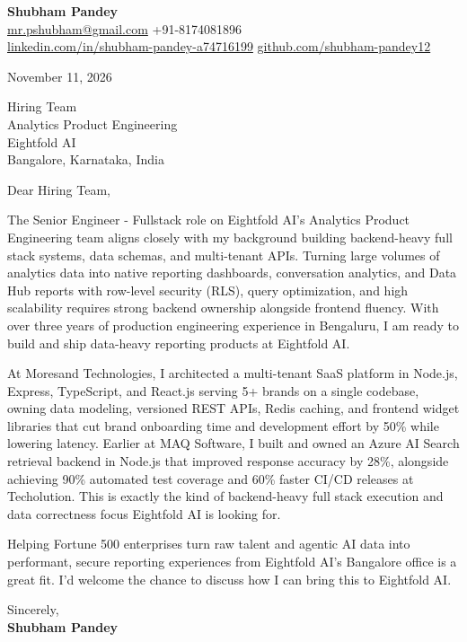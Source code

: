 \documentclass[a4paper,11pt]{article}
\begin{document}
\textbf{\Large Shubham Pandey}\\
\href{mailto:mr.pshubham@gmail.com}{mr.pshubham@gmail.com} \quad +91-8174081896\\
\href{https://www.linkedin.com/in/shubham-pandey-a74716199/}{linkedin.com/in/shubham-pandey-a74716199} \quad
\href{https://github.com/shubham-pandey12}{github.com/shubham-pandey12}

\vspace{1em}
November 11, 2026

\vspace{1em}
Hiring Team\\
Analytics Product Engineering\\
Eightfold AI\\
Bangalore, Karnataka, India

\vspace{1em}
Dear Hiring Team,

The Senior Engineer - Fullstack role on Eightfold AI's Analytics Product Engineering team aligns closely with my background building backend-heavy full stack systems, data schemas, and multi-tenant APIs. Turning large volumes of analytics data into native reporting dashboards, conversation analytics, and Data Hub reports with row-level security (RLS), query optimization, and high scalability requires strong backend ownership alongside frontend fluency. With over three years of production engineering experience in Bengaluru, I am ready to build and ship data-heavy reporting products at Eightfold AI.

At Moresand Technologies, I architected a multi-tenant SaaS platform in Node.js, Express, TypeScript, and React.js serving 5+ brands on a single codebase, owning data modeling, versioned REST APIs, Redis caching, and frontend widget libraries that cut brand onboarding time and development effort by 50\% while lowering latency. Earlier at MAQ Software, I built and owned an Azure AI Search retrieval backend in Node.js that improved response accuracy by 28\%, alongside achieving 90\% automated test coverage and 60\% faster CI/CD releases at Techolution. This is exactly the kind of backend-heavy full stack execution and data correctness focus Eightfold AI is looking for.

Helping Fortune 500 enterprises turn raw talent and agentic AI data into performant, secure reporting experiences from Eightfold AI's Bangalore office is a great fit. I'd welcome the chance to discuss how I can bring this to Eightfold AI.

\vspace{1em}
Sincerely,\\[0.5em]
\textbf{Shubham Pandey}
\end{document}
